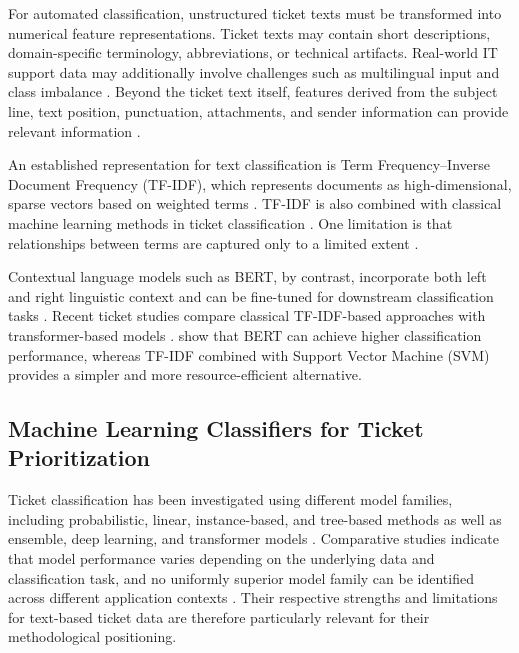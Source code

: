 For automated classification, unstructured ticket texts must be transformed into numerical feature representations. Ticket texts may contain short descriptions, domain-specific terminology, abbreviations, or technical artifacts. Real-world IT support data may additionally involve challenges such as multilingual input and class imbalance \cite{lyubinets2018labeling,razma2026classification}. Beyond the ticket text itself, features derived from the subject line, text position, punctuation, attachments, and sender information can provide relevant information \cite{beckers2009multifacet}.

An established representation for text classification is Term Frequency--Inverse Document Frequency (TF-IDF), which represents documents as high-dimensional, sparse vectors based on weighted terms \cite{manning2008introduction}. TF-IDF is also combined with classical machine learning methods in ticket classification \cite{revina2020ticket}. One limitation is that relationships between terms are captured only to a limited extent \cite{bonechi2024support}.

Contextual language models such as BERT, by contrast, incorporate both left and right linguistic context and can be fine-tuned for downstream classification tasks \cite{devlin2019bert}. Recent ticket studies compare classical TF-IDF-based approaches with transformer-based models \cite{bonechi2024support,razma2026classification}. \citet{bonechi2024support} show that BERT can achieve higher classification performance, whereas TF-IDF combined with Support Vector Machine (SVM) provides a simpler and more resource-efficient alternative.

\subsection{Machine Learning Classifiers for Ticket Prioritization}

Ticket classification has been investigated using different model families, including probabilistic, linear, instance-based, and tree-based methods as well as ensemble, deep learning, and transformer models \cite{revina2020ticket,ahmed2023incident}. Comparative studies indicate that model performance varies depending on the underlying data and classification task, and no uniformly superior model family can be identified across different application contexts \cite{revina2020ticket,ahmed2023incident}. Their respective strengths and limitations for text-based ticket data are therefore particularly relevant for their methodological positioning.

